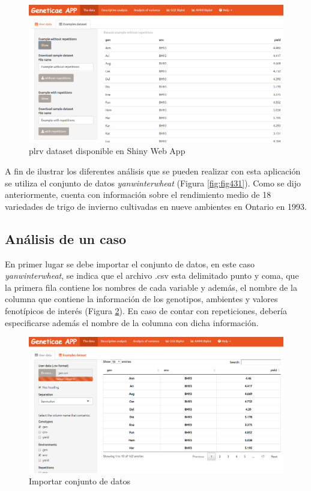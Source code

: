 \begin{figure}[H]
	\begin{center}
		\includegraphics[width=16cm]{./Graficos/Exampledatasets_withrep.png}
	\end{center}
	\caption{plrv dataset disponible en Shiny Web App}
	\label{fig:fig432}
\end{figure}


A fin de ilustrar los diferentes análisis que se pueden realizar con esta aplicación se utiliza el conjunto de datos \emph{yanwinterwheat} (Figura \ref{fig:fig431}). Como se dijo anteriormente, cuenta con información sobre el rendimiento medio de 18 variedades de trigo de invierno cultivadas en nueve ambientes en Ontario en 1993.


\subsection{Análisis de un caso}
En primer lugar se debe importar el conjunto de datos, en este caso \emph{yanwinterwheat}, se indica que el archivo .csv esta delimitado punto y coma, que la primera fila contiene los nombres de cada variable y además, el nombre de la columna que contiene la información de los genotipos, ambientes y valores fenotípicos de interés (Figura \ref{fig:fig433}). En caso de contar con repeticiones, debería especificarse además el nombre de la columna con dicha información.

\begin{figure}[h]
	\begin{center}
		\includegraphics[width=16cm]{./Graficos/data.png}
	\end{center}
	\caption{Importar conjunto de datos}
	\label{fig:fig433}
\end{figure}


